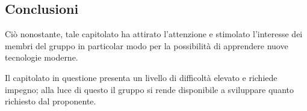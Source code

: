 \subsection{Conclusioni}
Ciò nonostante, tale capitolato ha attirato l'attenzione e stimolato l'interesse dei membri del gruppo in particolar modo per la possibilità di apprendere nuove tecnologie moderne.

Il capitolato in questione presenta un livello di difficoltà elevato e richiede impegno; alla luce di questo il gruppo si rende disponibile a sviluppare quanto richiesto dal proponente. 

